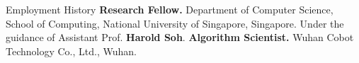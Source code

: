\begin{rubric}{Employment History}
\entry*[2019 -- 2020]%
	\textbf{Research Fellow.} Department of Computer Science, School of Computing, National University of Singapore, Singapore. Under the guidance of Assistant Prof. \textbf{Harold Soh}.  
%
%
\entry*[2018 -- 2019]%
	\textbf{Algorithm Scientist.} Wuhan Cobot Technology Co., Ltd., Wuhan.
%
\end{rubric}